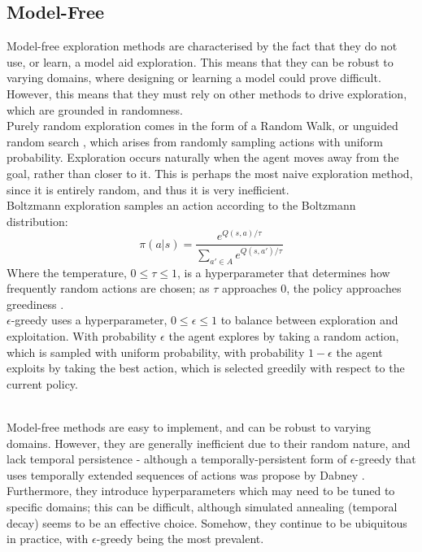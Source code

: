 \subsection{Model-Free}
Model-free exploration methods are characterised by the fact that they do not use, or learn, a model aid exploration. This means that they can be robust to varying domains, where designing or learning a model could prove difficult. However, this means that they must rely on other methods to drive exploration, which are grounded in randomness.
\\ Purely random exploration comes in the form of a Random Walk, or unguided random search \cite{anderson86}, which arises from randomly sampling actions with uniform probability. Exploration occurs naturally when the agent moves away from the goal, rather than closer to it. This is perhaps the most naive exploration method, since it is entirely random, and thus it is very inefficient.
\\ Boltzmann exploration samples an action according to the Boltzmann distribution:
\begin{equation}
\label{eqn:boltzmann}
\pi(a|s) = \frac{e^{Q(s,a)/\tau}}{\sum_{a' \in A}e^{Q(s,a')/\tau}}
\end{equation}
Where the temperature, $0 \le \tau \le 1$, is a hyperparameter that determines how frequently random actions are chosen; as $\tau$ approaches 0, the policy approaches greediness \cite{Thrun-1992-15850, DBLP:journals/corr/abs-2109-00157}. 
\\$\epsilon$-greedy \cite{Watkins:1989, conf/nips/Sutton95} uses a hyperparameter, $0 \le \epsilon \le 1$ to balance between exploration and exploitation. With probability $\epsilon$ the agent explores by taking a random action, which is sampled with uniform probability, with probability $1-\epsilon$ the agent exploits by taking the best action, which is selected greedily with respect to the current policy. 

\\Model-free methods are easy to implement, and can be robust to varying domains. However, they are generally inefficient due to their random nature, and lack temporal persistence - although a temporally-persistent form of $\epsilon$-greedy that uses temporally extended sequences of actions was propose by Dabney \cite{dabney2021temporallyextended}. Furthermore, they introduce hyperparameters which may need to be tuned to specific domains; this can be difficult, although simulated annealing (temporal decay) seems to be an effective choice. Somehow, they continue to be ubiquitous in practice, with $\epsilon$-greedy being the most prevalent.

